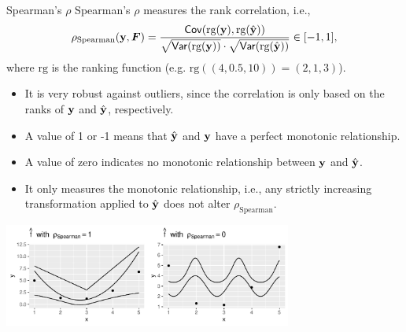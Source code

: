 \begin{vbframe}{Spearman's $\rho$}
\footnotesize
Spearman's $\rho$ measures the rank correlation, i.e.,
\[
\rho_{\text{Spearman}}(\mathbf{y}, \boldsymbol{F}) = \frac{\mathsf{Cov}(\textrm{rg}(\mathbf{y}),\textrm{rg}(\hat{\mathbf{y}}))}
{\sqrt{\mathsf{Var}(\textrm{rg}(\mathbf{y}))}\cdot\sqrt{\mathsf{Var}(\textrm{rg}(\hat{\mathbf{y}}))}}  \in [-1, 1],
\]
where $\textrm{rg}$ is the ranking function (e.g. $\textrm{rg}((4, 0.5, 10)) = 
(2, 1, 3)$).

\begin{itemize}
  \item It is very robust against outliers, since the correlation is only based 
  on the ranks of $\mathbf{y}$ and $\hat{\mathbf{y}}$, respectively.
  \item A value of 1 or -1 means that $\hat{\mathbf{y}}$ and $\mathbf{y}$ have a perfect monotonic 
  relationship.  
  \item A  value of zero indicates no monotonic relationship between 
  $\mathbf{y}$ and $\hat{\mathbf{y}}$.
  \item It only measures the monotonic relationship, i.e., any strictly
  increasing transformation applied to $\hat{\mathbf{y}}$ does not alter 
  $\rho_{\text{Spearman}}$.

\end{itemize}
\begin{center}
\includegraphics[width=0.71\textwidth]{figure/eval_spearman}
\end{center}
\end{vbframe}


